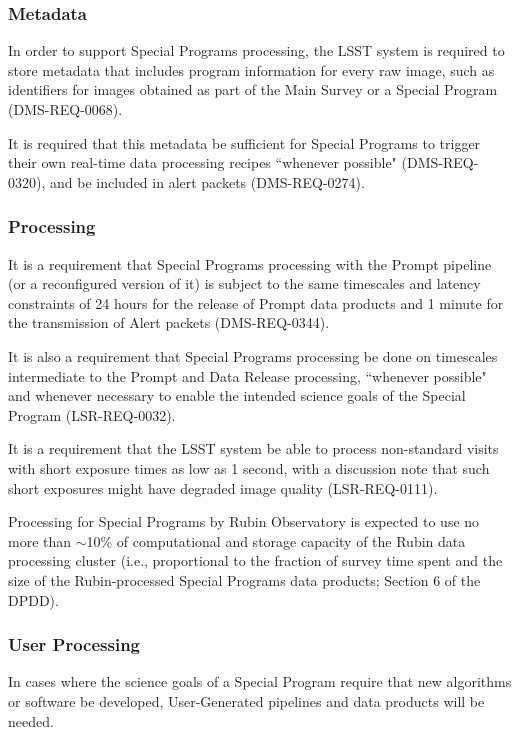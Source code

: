 \documentclass[DM,lsstdoc,toc]{lsstdoc}
\begin{document}
\subsubsection{Metadata}

In order to support Special Programs processing, the LSST system is required to store metadata that includes program information for every raw image, such as identifiers for images obtained as part of the Main Survey or a Special Program (DMS-REQ-0068).

It is required that this metadata be sufficient for Special Programs to trigger their own real-time data processing recipes ``whenever possible" (DMS-REQ-0320), and be included in alert packets (DMS-REQ-0274).

\subsubsection{Processing}

It is a requirement that Special Programs processing with the Prompt pipeline (or a reconfigured version of it) is subject to the same timescales and latency constraints of 24 hours for the release of Prompt data products and 1 minute for the transmission of Alert packets (DMS-REQ-0344).

It is also a requirement that Special Programs processing be done on timescales intermediate to the Prompt and Data Release processing, ``whenever possible" and whenever necessary to enable the intended science goals of the Special Program (LSR-REQ-0032).

It is a requirement that the LSST system be able to process non-standard visits with short exposure times as low as 1 second, with a discussion note that such short exposures might have degraded image quality (LSR-REQ-0111).

Processing for Special Programs by Rubin Observatory is expected to use no more than $\sim$10\% of computational and storage capacity of the Rubin data processing cluster (i.e., proportional to the fraction of survey time spent and the size of the Rubin-processed Special Programs data products; Section 6 of the DPDD).

\subsubsection{User Processing}

In cases where the science goals of a Special Program require that new algorithms or software be developed, User-Generated pipelines and data products will be needed.
\end{document}
